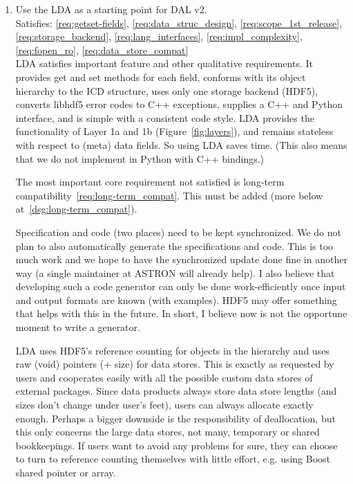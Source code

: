 \documentclass[a4paper,11pt]{article}
\begin{document}
\begin{enumerate}[label=\it D.\arabic{*}]
\itemsep0em

\item \label{dsg:LDA} Use the LDA as a starting point for DAL v2.\\
Satisfies: \ref{req:getset-fields}, \ref{req:data_struc_design}, \ref{req:scope_1st_release}, \ref{req:storage_backend}, \ref{req:lang_interfaces}, \ref{req:impl_complexity}, \ref{req:fopen_ro}, \ref{req:data_store_compat}\\

LDA satisfies important feature and other qualitative requirements.
It provides get and set methods for each field, conforms with its object hierarchy to the ICD structure, uses only one storage backend (HDF5), converts libhdf5 error codes to C++ exceptions, supplies a C++ and Python interface, and is simple with a consistent code style.
LDA provides the functionality of Layer 1a and 1b (Figure~\ref{fig:layers}), and remains stateless with respect to (meta) data fields.
So using LDA saves time.
(This also means that we do not implement in Python with C++ bindings.)

The most important core requirement not satisfied is long-term compatibility~\ref{req:long-term_compat}.
This must be added (more below at~\ref{dsg:long-term_compat}).

Specification and code (two places) need to be kept synchronized.
We do not plan to also automatically generate the specifications and code.
This is too much work and we hope to have the synchronized update done fine in another way (a single maintainer at ASTRON will already help).
I also believe that developing such a code generator can only be done work-efficiently once input and output formats are known (with examples).
HDF5 may offer something that helps with this in the future.
In short, I believe now is not the opportune moment to write a generator.

LDA uses HDF5's reference counting for objects in the hierarchy and uses raw (void) pointers (+ size) for data stores.
This is exactly as requested by users and cooperates easily with all the possible custom data stores of external packages.
Since data products always store data store lengths (and sizes don't change under user's feet), users can always allocate exactly enough.
Perhaps a bigger downside is the responsibility of deallocation, but this only concerns the large data stores, not many, temporary or shared bookkeepings.
If users want to avoid any problems for sure, they can choose to turn to reference counting themselves with little effort, e.g. using Boost shared pointer or array.


\end{enumerate}
\end{document}
